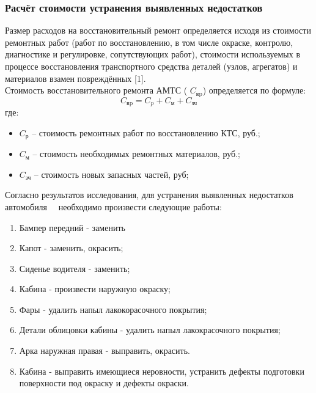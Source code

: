 {   

\subsubsection*{Расчёт стоимости устранения выявленных недостатков}

\par Размер расходов на восстановительный ремонт определяется исходя из стоимости ремонтных работ (работ по восстановлению, в том числе окраске, контролю, диагностике и регулировке, сопутствующих работ), стоимости используемых в процессе восстановления транспортного средства деталей (узлов, агрегатов) и материалов взамен повреждённых [1].\\
%                                         
Стоимость восстановительного ремонта АМТС ( $ C_\text{вp} $) определяется по формуле:
%
\begin{equation}\label{eq:r}
C_\text{вp} =C_p + C_\text{м} + C_\text{зч} 
\end{equation}
%
\noindent где:
%
\begin{itemize}
	\item[ ]$C_\text {р} $ --  стоимость ремонтных работ по восстановлению КТС, руб.;
	\item[ ]$ C_\text{м} $ --  стоимость необходимых ремонтных материалов, руб.;
	\item[ ]$ C_\text{зч} $ --  стоимость новых запасных частей, руб;
\end{itemize}

Согласно результатов исследования, для устранения выявленных недостатков автомобиля \,  \, необходимо произвести следующие работы:

\begin{enumerate}
	\item Бампер передний - заменить
	\item Капот - заменить, окрасить;
	\item Сиденье водителя - заменить;
	\item Кабина - произвести наружную окраску;
	\item Фары - удалить напыл лакокорасочного покрытия;
	\item Детали облицовки кабины - удалить напыл лакокрасочного покрытия;
	\item Арка наружная правая - выправить, окрасить.
	\item Кабина - выправить имеющиеся неровности, устранить дефекты подготовки поверхности под окраску и дефекты окраски.
\end{enumerate}


}
